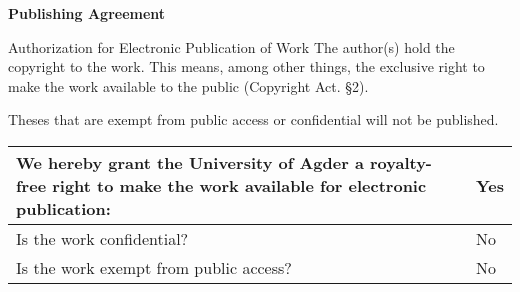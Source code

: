 \large{\textbf{Publishing Agreement}}

{\small {} Authorization for Electronic Publication of Work
The author(s) hold the copyright to the work. This means, among other things, the exclusive right to make the work available to the public (Copyright Act. §2).

Theses that are exempt from public access or confidential will not be published.\\
\begin{center}
\begin{tabular}{ |p{10cm}|p{3cm}|}
\hline
We hereby grant the University of Agder a royalty-free right to make the work available for electronic publication: & Yes \\
\hline
Is the work confidential? & No \\
\hline
Is the work exempt from public access? & No \\
\hline
\end{tabular}
\end{center}
}
